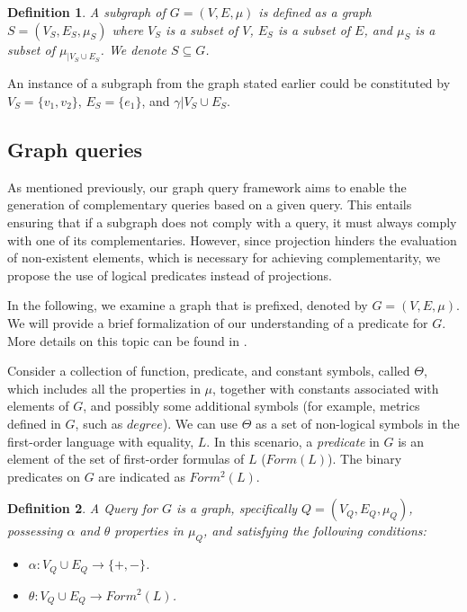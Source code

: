\documentclass[mathematics,article,submit,pdftex,moreauthors]{Definitions/mdpi}
\newtheorem{definition}{Definition}[section]
\begin{document}
\begin{definition}{}
    A subgraph of $G = (V, E,\mu)$ is defined as a graph $S = (V_S, E_S,\mu_S)$ where $V_S$ is a subset of $V$, $E_S$ is a subset of $E$, and $\mu_S$ is a subset of $\mu_{|V_S \cup E_S}$. We denote $S \subseteq G$. 
\end{definition}

An instance of a subgraph from the graph stated earlier could be constituted by $V_S=\{v_1,v_2\}$, $E_S=\{e_1\}$, and $\gamma{|V_S \cup E_S}$.

\subsection{Graph queries}

As mentioned previously, our graph query framework aims to enable the generation of complementary queries based on a given query. This entails ensuring that if a subgraph does not comply with a query, it must always comply with one of its complementaries. However, since projection hinders the evaluation of non-existent elements, which is necessary for achieving complementarity, we propose the use of logical predicates instead of projections. 

In the following, we examine a graph that is prefixed, denoted by $G=(V,E,\mu)$. We will provide a brief formalization of our understanding of a predicate for $G$. More details on this topic can be found in \cite{Bonifati}.

Consider a collection of function, predicate, and constant symbols, called $\Theta$, which includes all the properties in $\mu$, together with constants associated with elements of $G$, and possibly some additional symbols (for example, metrics defined in $G$, such as $degree$). We can use $\Theta$ as a set of non-logical symbols in the first-order language with equality, $L$. In this scenario, a \textit{predicate} in $G$ is an element of the set of first-order formulas of $L$ ($Form(L)$). The binary predicates on $G$ are indicated as $Form^2(L)$.

\begin{definition}{}
    A \emph{Query} for $G$ is a graph, specifically $Q = (V_Q, E_Q, \mu_Q)$, possessing $\alpha$ and $\theta$ properties in $\mu_Q$, and satisfying the following conditions:
    \begin{itemize}
        \item $\alpha:V_Q\cup E_Q\rightarrow \{+,-\}$.
        \item $\theta:V_Q\cup E_Q\rightarrow Form^2(L)$.
    \end{itemize}
\end{definition}\medskip
\end{document}

